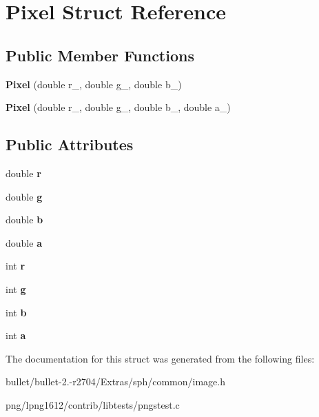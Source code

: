 \hypertarget{class_pixel}{\section{Pixel Struct Reference}
\label{class_pixel}
}
\subsection*{Public Member Functions}
\begin{DoxyCompactItemize}
\item 
\hypertarget{class_pixel_ae06e78bd19cdb5aa236f32b3a8bb7de4}{{\bfseries Pixel} (double r\+\_\+, double g\+\_\+, double b\+\_\+)}\label{class_pixel_ae06e78bd19cdb5aa236f32b3a8bb7de4}

\item 
\hypertarget{class_pixel_a32294f2e58a63e09ffdf502331cf8540}{{\bfseries Pixel} (double r\+\_\+, double g\+\_\+, double b\+\_\+, double a\+\_\+)}\label{class_pixel_a32294f2e58a63e09ffdf502331cf8540}

\end{DoxyCompactItemize}
\subsection*{Public Attributes}
\begin{DoxyCompactItemize}
\item 
\hypertarget{class_pixel_a83c6a8aa96a5cf5409e56b55a755378c}{double {\bfseries r}}\label{class_pixel_a83c6a8aa96a5cf5409e56b55a755378c}

\item 
\hypertarget{class_pixel_aafe4d2eac8ede1e2a6b3ae3ed8d48c14}{double {\bfseries g}}\label{class_pixel_aafe4d2eac8ede1e2a6b3ae3ed8d48c14}

\item 
\hypertarget{class_pixel_a4ef0a41e050f13892044b16d2b9def1b}{double {\bfseries b}}\label{class_pixel_a4ef0a41e050f13892044b16d2b9def1b}

\item 
\hypertarget{class_pixel_aabfd6177e5571577e88db8683abedc9e}{double {\bfseries a}}\label{class_pixel_aabfd6177e5571577e88db8683abedc9e}

\item 
\hypertarget{class_pixel_a8bdcc8f589c30333ec3f88d2c26d4e3a}{int {\bfseries r}}\label{class_pixel_a8bdcc8f589c30333ec3f88d2c26d4e3a}

\item 
\hypertarget{class_pixel_a73515f179e3c1bd28156e434da111d05}{int {\bfseries g}}\label{class_pixel_a73515f179e3c1bd28156e434da111d05}

\item 
\hypertarget{class_pixel_a94b067f3c79425c953631f7bf1c7536c}{int {\bfseries b}}\label{class_pixel_a94b067f3c79425c953631f7bf1c7536c}

\item 
\hypertarget{class_pixel_aeaad5ecfb916aef136cc8919d8e63a3c}{int {\bfseries a}}\label{class_pixel_aeaad5ecfb916aef136cc8919d8e63a3c}

\end{DoxyCompactItemize}


The documentation for this struct was generated from the following files\+:\begin{DoxyCompactItemize}
\item 
bullet/bullet-\/2.-\/r2704/\+Extras/sph/common/image.\+h\item 
png/lpng1612/contrib/libtests/pngstest.\+c\end{DoxyCompactItemize}
